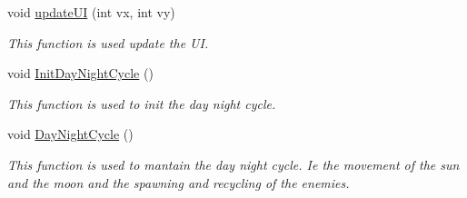 \begin{DoxyCompactItemize}
void \hyperlink{classoctet_1_1minecraft__wars_aea40090026e3facc7caf198b41211c7a}{update\+U\+I} (int vx, int vy)
\begin{DoxyCompactList}\small\item\em This function is used update the U\+I. \end{DoxyCompactList}\item 
void \hyperlink{classoctet_1_1minecraft__wars_ab84c69192d90263fb5ae0280b7f0d325}{Init\+Day\+Night\+Cycle} ()
\begin{DoxyCompactList}\small\item\em This function is used to init the day night cycle. \end{DoxyCompactList}\item 
void \hyperlink{classoctet_1_1minecraft__wars_af4b0e7ecdbaa960f7e4b39c05d2b84ad}{Day\+Night\+Cycle} ()
\begin{DoxyCompactList}\small\item\em This function is used to mantain the day night cycle. Ie the movement of the sun and the moon and the spawning and recycling of the enemies. \end{DoxyCompactList}\end{DoxyCompactItemize}
